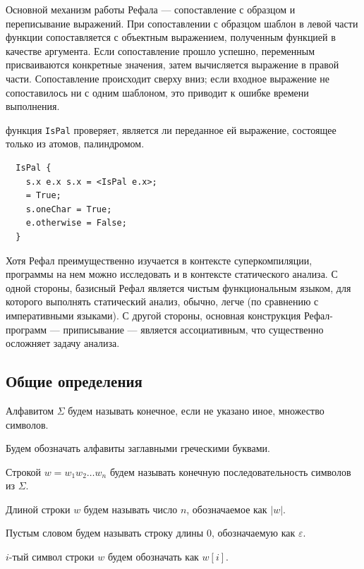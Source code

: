 Основной механизм работы Рефала --- сопоставление с образцом и переписывание выражений. При сопоставлении с образцом шаблон в левой части функции сопоставляется с объектным выражением, полученным функцией в качестве аргумента. Если сопоставление прошло успешно, переменным присваиваются конкретные значения, затем вычисляется выражение в правой части. 
Сопоставление происходит сверху вниз; если входное выражение не сопоставилось ни с одним шаблоном, это приводит к ошибке времени выполнения.

 функция \texttt{IsPal} проверяет, является ли переданное ей выражение, состоящее только из атомов, палиндромом.

\begin{listing}[H]
  \caption{Пример функции на базисном Рефале}
  \label{lst:IsPal}
  \begin{verbatim}
  IsPal {
    s.x e.x s.x = <IsPal e.x>;
    = True;
    s.oneChar = True;
    e.otherwise = False;
  }
  \end{verbatim}
\end{listing}

Хотя Рефал преимущественно изучается в контексте суперкомпиляции, программы на нем можно исследовать и в контексте статического анализа. 
С одной стороны, базисный Рефал 
является чистым функциональным языком, для которого выполнять статический анализ, обычно, легче (по сравнению с императивными языками). С другой стороны, основная конструкция Рефал-программ --- приписывание --- является 
ассоциативным, что существенно осложняет задачу анализа.

\subsection{Общие определения} %

\begin{Definition}[Алфавит]
  Алфавитом $\Sigma$ будем называть конечное, если не указано иное, множество символов.
\end{Definition}

Будем обозначать алфавиты заглавными греческими буквами.

\begin{Definition}
  Строкой $w = w_1 w_2 \ldots w_n$ будем называть 
  конечную последовательность символов из $\Sigma$.

  Длиной строки $w$ будем называть число $n$, обозначаемое как $|w|$.

  Пустым словом будем называть строку длины 0, обозначаемую как $\varepsilon$.

  $i$-тый символ строки $w$ будем обозначать как $w[i]$.
\end{Definition}


